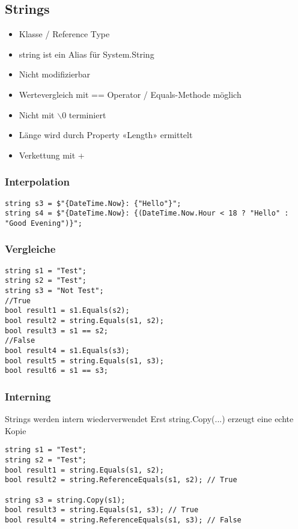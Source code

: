 \begin{multicols*}{2}
\subsection{Strings}
\begin{itemize}
    \item Klasse / Reference Type
    \item string ist ein Alias für System.String
    \item Nicht modifizierbar
    \item Wertevergleich mit == Operator / Equals-Methode möglich
    \item Nicht mit $\backslash$0 terminiert
    \item Länge wird durch Property «Length» ermittelt
    \item Verkettung mit +
\end{itemize}
\subsubsection{Interpolation}
\begin{lstlisting}
string s3 = $"{DateTime.Now}: {"Hello"}";
string s4 = $"{DateTime.Now}: {(DateTime.Now.Hour < 18 ? "Hello" : "Good Evening")}";  
\end{lstlisting}
\subsubsection{Vergleiche}
\begin{lstlisting}
string s1 = "Test"; 
string s2 = "Test"; 
string s3 = "Not Test";
//True
bool result1 = s1.Equals(s2);
bool result2 = string.Equals(s1, s2);
bool result3 = s1 == s2;
//False
bool result4 = s1.Equals(s3);
bool result5 = string.Equals(s1, s3);
bool result6 = s1 == s3;
\end{lstlisting}
\subsubsection{Interning}
Strings werden intern wiederverwendet
Erst string.Copy(...) erzeugt eine echte Kopie

\begin{lstlisting}
string s1 = "Test"; 
string s2 = "Test";
bool result1 = string.Equals(s1, s2);
bool result2 = string.ReferenceEquals(s1, s2); // True

string s3 = string.Copy(s1);
bool result3 = string.Equals(s1, s3); // True 
bool result4 = string.ReferenceEquals(s1, s3); // False
\end{lstlisting}
\end{multicols*}